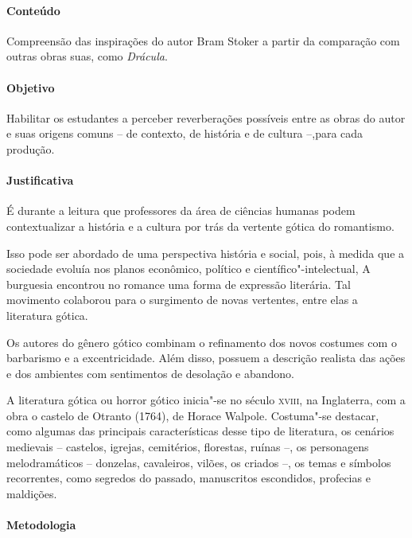 \documentclass[12pt]{extarticle}
\begin{document}
\paragraph{Conteúdo} Compreensão das inspirações do autor Bram Stoker a partir
da comparação com outras obras suas, como \emph{Drácula}.

\paragraph{Objetivo} Habilitar os estudantes a perceber reverberações possíveis 
entre as obras do autor e suas origens comuns -- de contexto, de história e de 
cultura --,para cada produção.

\paragraph{Justificativa} É durante a leitura que professores da área de ciências humanas
podem contextualizar a história e a cultura por trás da vertente gótica
do romantismo.

Isso pode ser abordado de uma perspectiva história e social, pois, à
medida que a sociedade evoluía nos planos econômico, político e
científico"-intelectual, A burguesia encontrou no romance uma forma de
expressão literária. Tal movimento colaborou para o surgimento de novas
vertentes, entre elas a literatura gótica.

Os autores do gênero gótico combinam o refinamento dos novos costumes
com o barbarismo e a excentricidade. Além disso, possuem a descrição
realista das ações e dos ambientes com sentimentos de desolação e
abandono.

A literatura gótica ou horror gótico inicia"-se no século \textsc{xviii}, na
Inglaterra, com a obra o castelo de Otranto (1764), de Horace Walpole.
Costuma"-se destacar, como algumas das principais características desse
tipo de literatura, os cenários medievais -- castelos, igrejas,
cemitérios, florestas, ruínas --, os personagens melodramáticos -- donzelas,
cavaleiros, vilões, os criados --, os temas e símbolos recorrentes, como segredos do 
passado, manuscritos escondidos, profecias e maldições.


\paragraph{Metodologia}
\end{document}

